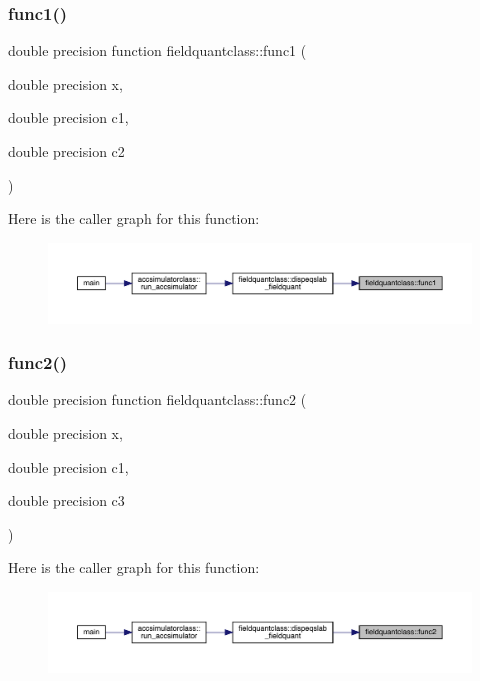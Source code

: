 \subsubsection{\texorpdfstring{func1()}{func1()}}
{\footnotesize\ttfamily double precision function fieldquantclass\+::func1 (\begin{DoxyParamCaption}\item[{double precision}]{x,  }\item[{double precision}]{c1,  }\item[{double precision}]{c2 }\end{DoxyParamCaption})}

Here is the caller graph for this function\+:\nopagebreak
\begin{figure}[H]
\begin{center}
\leavevmode
\includegraphics[width=350pt]{namespacefieldquantclass_a3979aaa9ea17b446b00cd5477dfd354e_icgraph}
\end{center}
\end{figure}
\mbox{\label{namespacefieldquantclass_a1758703e79afc95b20c7fd7261fa4afe}} 
\subsubsection{\texorpdfstring{func2()}{func2()}}
{\footnotesize\ttfamily double precision function fieldquantclass\+::func2 (\begin{DoxyParamCaption}\item[{double precision}]{x,  }\item[{double precision}]{c1,  }\item[{double precision}]{c3 }\end{DoxyParamCaption})}

Here is the caller graph for this function\+:\nopagebreak
\begin{figure}[H]
\begin{center}
\leavevmode
\includegraphics[width=350pt]{namespacefieldquantclass_a1758703e79afc95b20c7fd7261fa4afe_icgraph}
\end{center}
\end{figure}
\mbox{\label{namespacefieldquantclass_a5d4c07c22ffea0330d90b66e590b24a8}} 
